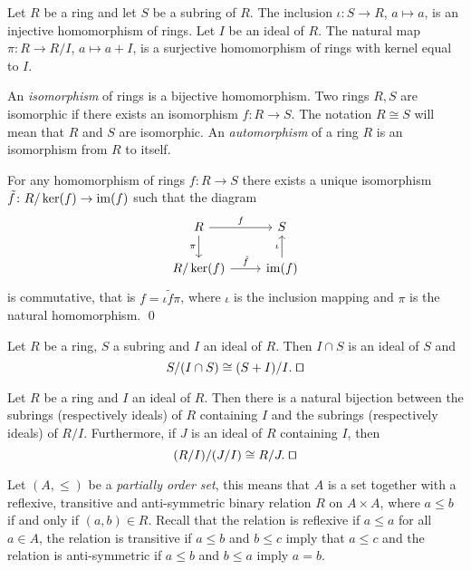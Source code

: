 \begin{example} 
Let $R$ be a ring and let $S$ be a subring of $R$. The inclusion $\iota\colon S\rightarrow R$, $a\mapsto a$, is an injective homomorphism of rings. Let $I$ be an ideal of $R$. The natural map $\pi\colon R\rightarrow R/I$, $a\mapsto a+I$, is a surjective homomorphism of rings with kernel equal to $I$.  
\end{example}


An {\em isomorphism} of rings is a bijective homomorphism. Two rings $R,S$ are isomorphic if there exists an isomorphism $f\colon R\rightarrow S$. The notation $R\cong S$ will mean that $R$ and $S$ are isomorphic. An {\em automorphism} of a ring $R$ is an isomorphism from $R$ to itself. 

\begin{theorem}
	For any homomorphism of rings $f\colon R\rightarrow S$ there exists a unique isomorphism 
	$\tilde f\colon R/\ker(f)\rightarrow\operatorname{im}(f)$ such that the diagram
	\[\begin{tikzcd}
		{R} & {S} \\
		{R/\ker(f)} & {\im(f)}
		\arrow["f", from=1-1, to=1-2]
		\arrow["{\pi}"', from=1-1, to=2-1]
		\arrow["{\iota}", from=2-2, to=1-2]
		\arrow["{\tilde f}", from=2-1, to=2-2]
	\end{tikzcd}
	\]
	is commutative, that is $f=\iota \tilde f\pi$, where $\iota$ 
	is the inclusion mapping and $\pi$ is the natural homomorphism. \qed	
\end{theorem} 

\begin{theorem}
	Let $R$ be a ring,  $S$ a subring and $I$ an ideal of $R$. Then $I\cap S$ is an ideal of $S$ and
	$$S/(I\cap S)\cong (S+I)/I. \; \qed$$  
\end{theorem}

\begin{theorem} 
Let $R$ be a ring and $I$ an ideal of $R$. Then there is a natural bijection between the subrings (respectively ideals) of $R$ containing $I$ and the subrings (respectively ideals) of $R/I$. 
Furthermore, if $J$ is an ideal of $R$ containing $I$, then
\[
(R/I)/(J/I)\cong R/J.\; \qed
\]
\end{theorem}

Let $(A,\leq)$ be a {\em partially order set}, this means that $A$ is a set together with a 
reflexive, transitive and anti-symmetric binary relation
$R$ on $A\times A$, where $a\leq b$ if and only if $(a,b)\in R$. 
Recall that the relation is reflexive if $a\leq a$ for all $a\in A$, the relation is transitive if 
$a\leq b$ and $b\leq c$ imply that 
$a\leq c$ and the relation is anti-symmetric if $a\leq b$ and $b\leq a$ imply $a=b$.


